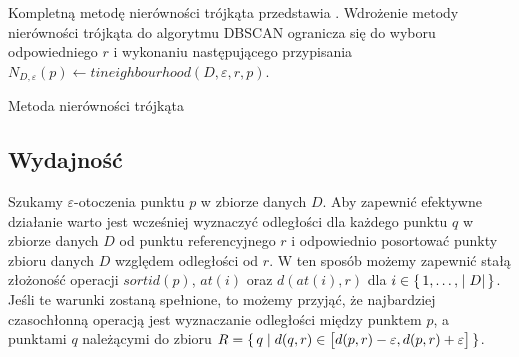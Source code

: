 Kompletną metodę nierówności trójkąta przedstawia . Wdrożenie metody nierówności trójkąta do algorytmu DBSCAN ogranicza się do wyboru odpowiedniego $ r $ i wykonaniu następującego przypisania \linebreak\mbox{$ N_{D,\varepsilon}(p) \gets tineighbourhood(D, \varepsilon, r, p) $.}

\begin{algorithm}[t]
	\caption{Metoda nierówności trójkąta}\label{alg:ti}
	
	\DontPrintSemicolon
	
	
	\setcounter{AlgoLine}{0}
	\nonl{}
	\setcounter{AlgoLine}{0}
	\nonl{}
	
	\setcounter{AlgoLine}{0}
	\nonl{}
	\nonl{}
\end{algorithm}

\subsection{Wydajność}
Szukamy $ \varepsilon $-otoczenia punktu $ p $ w zbiorze danych $ D $. Aby zapewnić efektywne działanie  warto jest wcześniej wyznaczyć odległości dla każdego punktu $ q $ w zbiorze danych $ D $ od punktu referencyjnego $ r $ i odpowiednio posortować punkty zbioru danych $ D $ względem odległości od $ r $. W ten sposób możemy zapewnić stałą złożoność operacji $ sortid(p) $, $ at(i) $ oraz $ d(at(i), r) $ dla $ i \in \set{1,\dots,|D|} $. Jeśli te warunki zostaną spełnione, to możemy przyjąć, że najbardziej czasochłonną operacją  jest wyznaczanie odległości między punktem $ p $, a punktami $ q $ należącymi do zbioru \mbox{$ R = \set{q | d(q, r) \in \left[d(p,r)-\varepsilon,d(p,r)+\varepsilon\right]} $}. 

